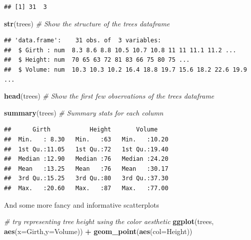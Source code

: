 \documentclass[
]{article}
\newenvironment{Shaded}{\begin{snugshade}}{\end{snugshade}}
\newcommand{\AttributeTok}[1]{\textcolor[rgb]{0.13,0.29,0.53}{#1}}
\newcommand{\CommentTok}[1]{\textcolor[rgb]{0.56,0.35,0.01}{\textit{#1}}}
\newcommand{\FunctionTok}[1]{\textcolor[rgb]{0.13,0.29,0.53}{\textbf{#1}}}
\newcommand{\NormalTok}[1]{#1}
\newcommand{\SpecialCharTok}[1]{\textcolor[rgb]{0.81,0.36,0.00}{\textbf{#1}}}
\begin{document}
\begin{verbatim}
## [1] 31  3
\end{verbatim}

\begin{Shaded}
\begin{Highlighting}[]
\FunctionTok{str}\NormalTok{(trees)   }\CommentTok{\# Show the structure of the trees dataframe}
\end{Highlighting}
\end{Shaded}

\begin{verbatim}
## 'data.frame':    31 obs. of  3 variables:
##  $ Girth : num  8.3 8.6 8.8 10.5 10.7 10.8 11 11 11.1 11.2 ...
##  $ Height: num  70 65 63 72 81 83 66 75 80 75 ...
##  $ Volume: num  10.3 10.3 10.2 16.4 18.8 19.7 15.6 18.2 22.6 19.9 ...
\end{verbatim}

\begin{Shaded}
\begin{Highlighting}[]
\FunctionTok{head}\NormalTok{(trees)   }\CommentTok{\# Show the first few observations of the trees dataframe}

\FunctionTok{summary}\NormalTok{(trees)  }\CommentTok{\# Summary stats for each column}
\end{Highlighting}
\end{Shaded}

\begin{verbatim}
##      Girth           Height       Volume     
##  Min.   : 8.30   Min.   :63   Min.   :10.20  
##  1st Qu.:11.05   1st Qu.:72   1st Qu.:19.40  
##  Median :12.90   Median :76   Median :24.20  
##  Mean   :13.25   Mean   :76   Mean   :30.17  
##  3rd Qu.:15.25   3rd Qu.:80   3rd Qu.:37.30  
##  Max.   :20.60   Max.   :87   Max.   :77.00
\end{verbatim}

And some more fancy and informative scatterplots

\begin{Shaded}
\begin{Highlighting}[]
    \CommentTok{\# try representing tree height using the color aesthetic}
\FunctionTok{ggplot}\NormalTok{(trees, }\FunctionTok{aes}\NormalTok{(}\AttributeTok{x=}\NormalTok{Girth,}\AttributeTok{y=}\NormalTok{Volume)) }\SpecialCharTok{+}
  \FunctionTok{geom\_point}\NormalTok{(}\FunctionTok{aes}\NormalTok{(}\AttributeTok{col=}\NormalTok{Height))}
\end{Highlighting}
\end{Shaded}
\end{document}
